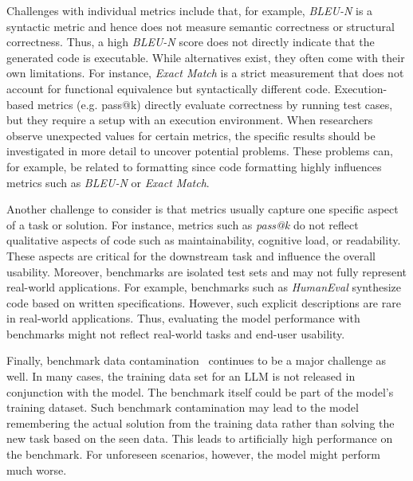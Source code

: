 Challenges with individual metrics include that, for example, \emph{BLEU-N} is a syntactic metric and hence does not measure semantic correctness or structural correctness.
Thus, a high \emph{BLEU-N} score does not directly indicate that the generated code is executable.
While alternatives exist, they often come with their own limitations.
For instance, \emph{Exact Match} is a strict measurement that does not account for functional equivalence but syntactically different code.
Execution-based metrics (e.g. pass@k) directly evaluate correctness by running test cases, but they require a setup with an execution environment.
When researchers observe unexpected values for certain metrics, the specific results should be investigated in more detail to uncover potential problems.
These problems can, for example, be related to formatting since code formatting highly influences metrics such as \emph{BLEU-N} or \emph{Exact Match}.

Another challenge to consider is that metrics usually capture one specific aspect of a task or solution.
For instance, metrics such as \emph{pass@k} do not reflect qualitative aspects of code such as maintainability, cognitive load, or readability.
These aspects are critical for the downstream task and influence the overall usability.
Moreover, benchmarks are isolated test sets and may not fully represent real-world applications.
For example, benchmarks such as \emph{HumanEval} synthesize code based on written specifications.
However, such explicit descriptions are rare in real-world applications.
Thus, evaluating the model performance with benchmarks might not reflect real-world tasks and end-user usability.

Finally, benchmark data contamination~\cite{DBLP:journals/corr/abs-2406-04244} continues to be a major challenge as well.
In many cases, the training data set for an LLM is not released in conjunction with the model.
The benchmark itself could be part of the model's training dataset.
Such benchmark contamination may lead to the model remembering the actual solution from the training data rather than solving the new task based on the seen data.
This leads to artificially high performance on the benchmark.
For unforeseen scenarios, however, the model might perform much worse.


